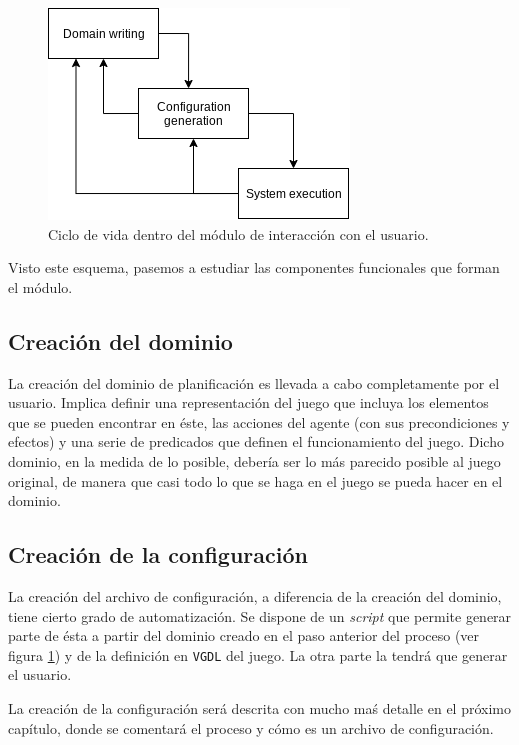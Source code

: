 \begin{figure}[H]
    \centering
    \includegraphics[scale=0.6]{img/CH05/iter_waterfall_model.png}
    \caption{Ciclo de vida dentro del módulo de interacción con el usuario.}
    \label{fig:iterative_waterfall_model}
\end{figure}

Visto este esquema, pasemos a estudiar las componentes funcionales que forman el módulo.

\subsection{Creación del dominio}

La creación del dominio de planificación es llevada a cabo completamente por el usuario.
Implica definir una representación del juego que incluya los elementos que se pueden
encontrar en éste, las acciones del agente (con sus precondiciones y efectos) y una serie de predicados
que definen el funcionamiento del juego. Dicho dominio, en la medida de lo posible, debería ser
lo más parecido posible al juego original, de manera que casi todo lo que se haga en el juego
se pueda hacer en el dominio.

\subsection{Creación de la configuración}

La creación del archivo de configuración, a diferencia de la creación del dominio, tiene cierto grado
de automatización. Se dispone de un \textit{script} que permite generar parte de ésta a partir del
dominio creado en el paso anterior del proceso (ver figura \ref{fig:iterative_waterfall_model}) y
de la definición en \texttt{VGDL} del juego. La otra parte la tendrá que generar el usuario.

La creación de la configuración será descrita con mucho maś detalle en el próximo capítulo,
donde se comentará el proceso y cómo es un archivo de configuración.

